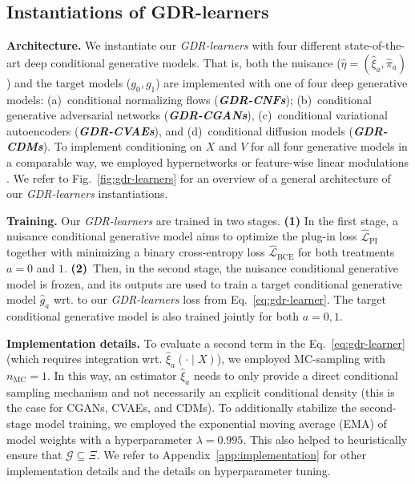 \documentclass[dvipsnames]{article} %
\newcommand{\GDRlearners}{\emph{GDR-learners}\xspace}
\begin{document}
\subsection{Instantiations of GDR-learners}
\vspace{-0.1cm}

\textbf{Architecture.} We instantiate our \GDRlearners with four different state-of-the-art deep conditional generative models. That is, both the nuisance ($\hat{\eta} = (\hat{\xi}_a, \hat{\pi}_a)$) and the target models ($g_0, g_1$) are implemented with one of four deep generative models: (a)~conditional normalizing flows \citep{rezende2015variational,trippe2018conditional} (\textbf{\emph{GDR-CNFs}}); (b)~conditional generative adversarial networks \citep{goodfellow2014generative, laria2022transferring} (\textbf{\emph{GDR-CGANs}}), (c)~conditional variational autoencoders \citep{kingma2014auto,oh2022cvae} (\textbf{\emph{GDR-CVAEs}}), and (d)~conditional diffusion models \citep{ho2020denoising,lutati2023ocd} (\textbf{\emph{GDR-CDMs}}). To implement conditioning on $X$ and $V$ for all four generative models in a comparable way, we employed hypernetworks \citep{ha2017hypernetworks} or feature-wise linear modulations \citep{perez2018film}. We refer to Fig.~\ref{fig:gdr-learners} for an overview of a general architecture of our \GDRlearners instantiations. 



\textbf{Training.} Our \GDRlearners are trained in two stages. \textbf{(1)} In the first stage, a nuisance conditional generative model aims to optimize the plug-in loss $\hat{\mathcal{L}}_{\text{PI}}$ together with minimizing a binary cross-entropy loss $\hat{\mathcal{L}}_{\text{BCE}}$ for both treatments $a=0$ and $1$. \textbf{(2)}~Then, in the second stage, the nuisance conditional generative model is frozen, and its outputs are used to train a target conditional generative model $\hat{g}_a$ wrt. to our \GDRlearners loss from Eq.~\eqref{eq:gdr-learner}. The target conditional generative model is also trained jointly for both $a = 0,1$. 



\textbf{Implementation details.} To evaluate a second term in the Eq.~\eqref{eq:gdr-learner} (which requires integration wrt. $\hat{\xi}_a(\cdot \mid X)$), we employed MC-sampling with $n_{\text{MC}} = 1$. In this way, an estimator $\hat{\xi}_a$ needs to only provide a direct conditional sampling mechanism and not necessarily an explicit conditional density (this is the case for CGANs, CVAEs, and CDMs). To additionally stabilize the second-stage model training, we employed the exponential moving average (EMA) of model weights \citep{polyak1992acceleration} with a hyperparameter $\lambda = 0.995$. This also helped to heuristically ensure that $\mathcal{G} \subseteq \mathit{\Xi}$. We refer to Appendix~\ref{app:implementation} for other implementation details and the details on hyperparameter tuning.
\end{document}
